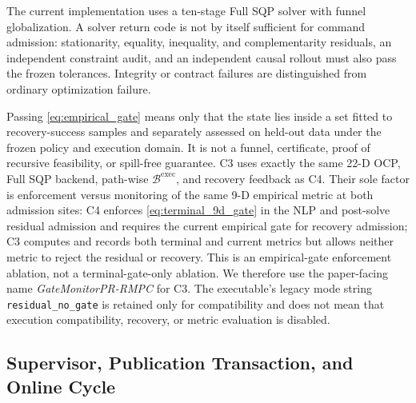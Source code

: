 The current implementation uses a ten-stage Full SQP solver with funnel
globalization.  A solver return code is not by itself sufficient for command
admission: stationarity, equality, inequality, and complementarity residuals,
an independent constraint audit, and an independent causal rollout must also
pass the frozen tolerances.  Integrity or contract failures are distinguished
from ordinary optimization failure.

Passing \eqref{eq:empirical_gate} means only that the state lies inside a set
fitted to recovery-success samples and separately assessed on held-out data
under the frozen policy and execution domain.  It is not a funnel,
certificate, proof of recursive feasibility, or spill-free guarantee.  C3
uses exactly the same 22-D OCP, Full SQP backend, path-wise
$\mathcal B^{\mathrm{exec}}$, and recovery feedback as C4.  Their sole factor
is enforcement versus monitoring of the same 9-D empirical metric at both
admission sites: C4 enforces \eqref{eq:terminal_9d_gate} in the NLP and
post-solve residual admission and requires the current empirical gate for
recovery admission; C3 computes and records both terminal and current metrics
but allows neither metric to reject the residual or recovery.  This is an empirical-gate
enforcement ablation, not a terminal-gate-only ablation.  We therefore use the
paper-facing name \emph{GateMonitorPR-RMPC} for C3.  The executable's legacy
mode string \texttt{residual\_no\_gate} is retained only for compatibility and
does not mean that execution compatibility, recovery, or metric evaluation is
disabled.

\subsection{Supervisor, Publication Transaction, and Online Cycle}

